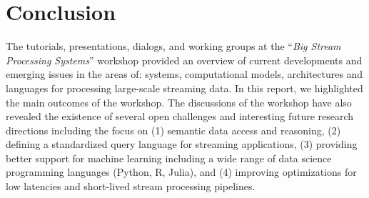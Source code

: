 \section{Conclusion}\label{sec:conclusion}
The tutorials, presentations, dialogs, and working groups at the ``\emph{Big Stream
  Processing Systems}'' workshop provided an overview of current developments and emerging issues in the areas of: systems,
computational models, architectures and languages for processing large-scale streaming data.
In this report, we highlighted the main outcomes of the workshop. The discussions of the workshop have also revealed the existence of several open challenges and interesting future research directions including the focus on (1) semantic data access and reasoning, (2) defining a standardized query language for streaming applications, (3) providing better support for machine learning including a wide range of data science programming languages (Python, R, Julia), and (4) improving optimizations for low latencies and short-lived stream processing pipelines.
